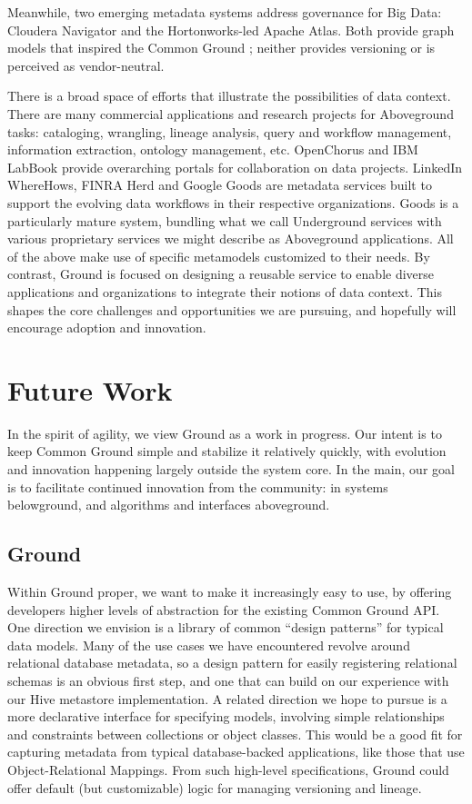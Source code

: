 \documentclass{sig-alternate}
\begin{document}
Meanwhile,
two emerging metadata systems address governance for Big Data: Cloudera Navigator and the Hortonworks-led Apache Atlas. 
Both provide graph models that inspired the Common Ground \modelgraph; neither provides versioning or is perceived as vendor-neutral. %

There is a broad space of efforts that illustrate the possibilities of data context. 
There are many commercial applications and research projects for Aboveground tasks: cataloging, wrangling, lineage analysis, query and workflow management, information extraction, ontology management, etc. 
OpenChorus and IBM LabBook provide overarching portals for collaboration on data projects.
LinkedIn WhereHows, FINRA Herd and Google Goods are metadata services built to support the evolving data workflows in their respective organizations. Goods is a particularly mature system, bundling what we call Underground services with various proprietary services we might describe as Aboveground applications.
All of the above make use of specific metamodels customized to their needs. By contrast, Ground is focused on designing a reusable service to enable diverse applications and organizations to integrate their notions 
of data context. 
This shapes the core challenges and opportunities we are pursuing, and hopefully will encourage adoption and innovation.

\section{Future Work}
In the spirit of agility, we view Ground as a work in progress. Our intent is to keep Common Ground simple and stabilize it relatively quickly, with evolution and innovation happening largely outside the system core. In the main, our goal is to facilitate continued innovation from the community: in systems belowground, and algorithms and interfaces aboveground.

\subsection{Ground}
Within Ground proper, we want to make it increasingly easy to use, by offering developers higher levels of abstraction for the existing Common Ground API.  One direction we envision is a library of common ``design patterns'' for typical data models. Many of the use cases we have encountered revolve around relational database metadata, so a design pattern for easily registering relational schemas is an obvious first step, and one that can build on our experience with our Hive metastore implementation. A related direction we hope to pursue is a more declarative interface for specifying models, involving simple relationships and constraints between collections or object classes. This would be a good fit for capturing metadata from typical database-backed applications, like those that use Object-Relational Mappings. From such high-level specifications, Ground could offer default (but customizable) logic for managing versioning and lineage.
\end{document}
